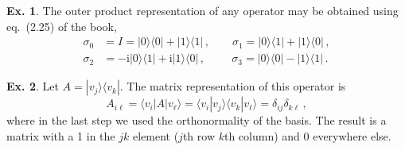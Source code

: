 \documentclass[a4paper,12pt]{article}
\def\imagi{\mathrm{i}}
\theoremstyle{definition}
\newtheorem{exercise}{Ex.}[section]
\begin{document}
\begin{exercise} The outer product representation of any operator may be obtained using eq.\ (2.25) of the book,
 \[
  \begin{aligned}
   \sigma_0 &= I = |0\rangle \langle 0| + |1\rangle\langle 1|\,,\quad\quad
   \sigma_1 = |0\rangle\langle1| + |1\rangle\langle0|\,,\\
   \sigma_2 &= -\imagi |0\rangle\langle 1| +\imagi |1\rangle\langle 0|\,,\quad\quad\ \,
   \sigma_3 = |0\rangle\langle 0| - |1\rangle\langle 1|\,.
  \end{aligned}
 \]
\end{exercise}

\begin{exercise}
 Let $A=|v_j\rangle\langle v_k|$. The matrix representation of this operator is
 \[
  A_{i\ell} = \langle v_i | A | v_\ell\rangle = \langle v_i | v_j\rangle \langle v_k | v_\ell\rangle = \delta_{ij}\delta_{k\ell}\,,
 \]
 where in the last step we used the orthonormality of the basis. The result is a matrix with a 1 in the $jk$ element ($j$th row $k$th column) and 0 everywhere else.
\end{exercise}
\end{document}
